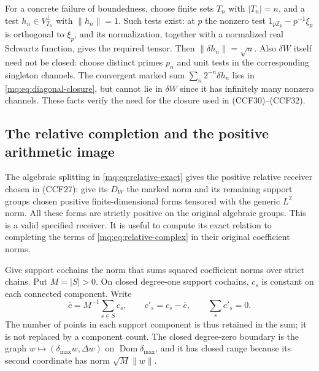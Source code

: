 \documentclass[11pt,a4paper]{article}
\theoremstyle{definition}\newtheorem{definition}[theorem]{Definition}
\newcommand{\Z}{\mathbb Z}\newcommand{\Q}{\mathbb Q}
\providecommand{\Dom}{\operatorname{Dom}}
\begin{document}
For a concrete failure of boundedness, choose finite sets $T_n$
with $|T_n|=n$, and a test $h_n\in V_{T_n}^\perp$ with
$\|h_n\|=1$. Such tests exist: at $p$ the nonzero test
$1_{p\Z_p}-p^{-1}\xi_p$ is orthogonal to $\xi_p$, and its
normalization, together with a normalized real Schwartz function,
gives the required tensor. Then $\|\delta h_n\|=\sqrt n$.
Also $\delta W$ itself need not be closed: choose distinct primes
$p_n$ and unit tests in the corresponding singleton channels.
The convergent marked sum $\sum_n2^{-n}\delta h_n$ lies in
\eqref{mq:eq:diagonal-closure}, but cannot lie in $\delta W$ since
it has infinitely many nonzero channels. These facts verify the
need for the closure used in (CCF30)--(CCF32).

\subsection{The relative completion and the positive arithmetic image}

The algebraic splitting in \eqref{mq:eq:relative-exact} gives the
positive relative receiver chosen in (CCF27): give its $D_W$ the
marked norm and its remaining support groups chosen positive
finite-dimensional forms tensored with the generic $L^2$ norm.
All these forms are strictly positive on the original algebraic
groups. This is a valid specified receiver. It is useful to compute
its exact relation to completing the terms of
\eqref{mq:eq:relative-complex} in their original coefficient norms.

Give support cochains the norm that sums squared coefficient norms
over strict chains. Put $M=|S|>0$. On closed degree-one support
cochains, $c_s$ is constant on each connected component. Write
\[
 \bar c=M^{-1}\sum_{s\in S}c_s,\qquad
 c'_s=c_s-\bar c,\qquad \sum_sc'_s=0.
 \tag{MQ23}\label{mq:eq:support-mean}
\]
The number of points in each support component is thus retained
in the sum; it is not replaced by a component count. The closed
degree-zero boundary is the graph
$w\mapsto(\delta_{\max}w,\Delta w)$ on
$\Dom\delta_{\max}$, and it has closed range because its
second coordinate has norm $\sqrt M\|w\|$.
\end{document}
